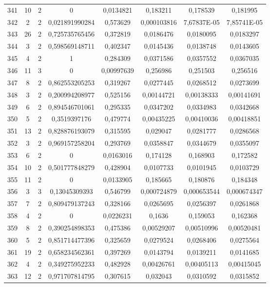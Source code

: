 \begin{longtable}{|c|c|c|c|c|c|c|c|}
341 & 10 & 2 & 0 & 0,0134821 & 0,183211 & 0,178539 & 0,181995  \\
342 & 2 & 2 & 0,021891990284 & 0,573629 & 0,000103816 & 7,67837E-05 & 7,85741E-05  \\
343 & 26 & 2 & 0,725735765456 & 0,372819 & 0,0186476 & 0,0180095 & 0,0183297  \\
344 & 3 & 2 & 0,598569148711 & 0,402347 & 0,0145436 & 0,0138748 & 0,0143605  \\
345 & 4 & 2 & 1 & 0,284309 & 0,0371586 & 0,0357552 & 0,0367035  \\
346 & 11 & 3 & 0 & 0,00997639 & 0,256986 & 0,251503 & 0,256516  \\
347 & 8 & 2 & 0,862553205253 & 0,319267 & 0,0277445 & 0,0268512 & 0,0273699  \\
348 & 3 & 2 & 0,200994208977 & 0,525156 & 0,00144721 & 0,00138333 & 0,00141691  \\
349 & 6 & 2 & 0,894546701061 & 0,295335 & 0,0347202 & 0,0334983 & 0,0342668  \\
350 & 5 & 2 & 0,3519397176 & 0,479774 & 0,00435225 & 0,00410036 & 0,00418851  \\
351 & 13 & 2 & 0,828876193079 & 0,315595 & 0,029047 & 0,0281777 & 0,0286568  \\
352 & 3 & 2 & 0,969157258204 & 0,293769 & 0,0358847 & 0,0344679 & 0,0355097  \\
353 & 6 & 2 & 0 & 0,0163016 & 0,174128 & 0,168903 & 0,172582  \\
354 & 10 & 2 & 0,501777848279 & 0,428904 & 0,0107733 & 0,0101945 & 0,0103729  \\
355 & 11 & 2 & 0 & 0,0133905 & 0,185665 & 0,180876 & 0,184348  \\
356 & 3 & 3 & 0,13045309393 & 0,546799 & 0,000724879 & 0,000653544 & 0,000674347  \\
357 & 7 & 2 & 0,809479137243 & 0,328166 & 0,0265695 & 0,0256397 & 0,0261868  \\
358 & 4 & 2 & 0 & 0,0226231 & 0,1636 & 0,159053 & 0,162368  \\
359 & 8 & 2 & 0,390254898353 & 0,475386 & 0,00529207 & 0,00510996 & 0,00520481  \\
360 & 5 & 2 & 0,851714477396 & 0,325659 & 0,0279524 & 0,0268406 & 0,0275564  \\
361 & 19 & 2 & 0,658234562361 & 0,397269 & 0,0143794 & 0,0139211 & 0,0141685  \\
362 & 4 & 2 & 0,349275952233 & 0,482928 & 0,00426761 & 0,00405113 & 0,00415045  \\
363 & 12 & 2 & 0,971707814795 & 0,307615 & 0,032043 & 0,0310592 & 0,0315852  \\

\end{longtable}
